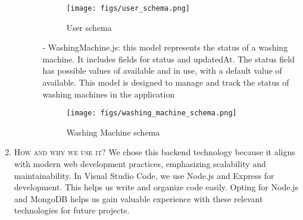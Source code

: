 \documentclass[conference]{IEEEtran}
\begin{document}
\begin{enumerate}
\begin{enumerate}
\begin{itemize}
\begin{figure}[H]
                    \texttt{[image: figs/user\_schema.png]}
                    \caption{User schema}
                    \label{fig:User Schema}
                    \end{figure}
                    \item[-] WashingMachine.js: this model represents the status of a washing machine. It includes fields for status and updatedAt. The status field has possible values of available and in use, with a default value of available. This model is designed to manage and track the status of washing machines in the application
                    \begin{figure}[H]
                    \centering
                    \texttt{[image: figs/washing\_machine\_schema.png]}
                    \caption{Washing Machine schema}
                    \label{fig:Washing Machine Schema}
                    \end{figure}
                \end{itemize}
        \end{enumerate}
    \item \textsc{How and why we use it?} We chose this backend technology because it aligns with modern web development practices, emphasizing scalability and maintainability. In Visual Studio Code, we use Node.js and Express for development. This helps us write and organize code easily. Opting for Node.js and MongoDB helps us gain valuable experience with these relevant technologies for future projects.
\end{enumerate}
\end{document}
